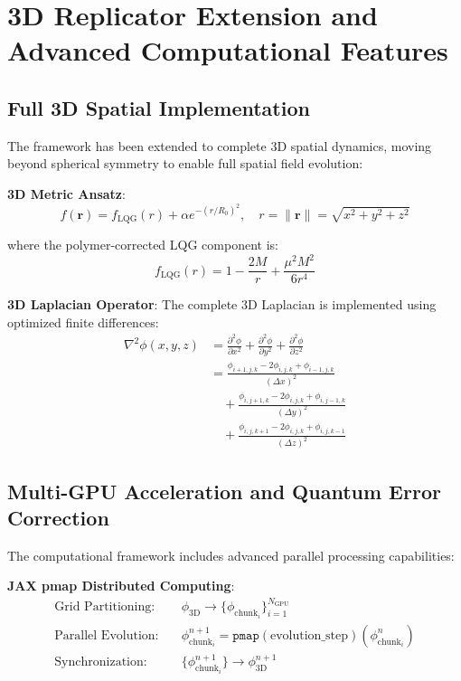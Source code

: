 \documentclass[11pt]{article}
\begin{document}
\section{3D Replicator Extension and Advanced Computational Features}

\subsection{Full 3D Spatial Implementation}

The framework has been extended to complete 3D spatial dynamics, moving beyond spherical symmetry to enable full spatial field evolution:

\textbf{3D Metric Ansatz}:
\begin{equation}
f(\mathbf{r}) = f_{\text{LQG}}(r) + \alpha e^{-(r/R_0)^2}, \quad r = \|\mathbf{r}\| = \sqrt{x^2 + y^2 + z^2}
\end{equation}

where the polymer-corrected LQG component is:
\begin{equation}
f_{\text{LQG}}(r) = 1 - \frac{2M}{r} + \frac{\mu^2 M^2}{6r^4}
\end{equation}

\textbf{3D Laplacian Operator}:
The complete 3D Laplacian is implemented using optimized finite differences:
\begin{align}
\nabla^2\phi(x,y,z) &= \frac{\partial^2\phi}{\partial x^2} + \frac{\partial^2\phi}{\partial y^2} + \frac{\partial^2\phi}{\partial z^2} \\
&= \frac{\phi_{i+1,j,k} - 2\phi_{i,j,k} + \phi_{i-1,j,k}}{(\Delta x)^2} \\
&\quad + \frac{\phi_{i,j+1,k} - 2\phi_{i,j,k} + \phi_{i,j-1,k}}{(\Delta y)^2} \\
&\quad + \frac{\phi_{i,j,k+1} - 2\phi_{i,j,k} + \phi_{i,j,k-1}}{(\Delta z)^2}
\end{align}

\subsection{Multi-GPU Acceleration and Quantum Error Correction}

The computational framework includes advanced parallel processing capabilities:

\textbf{JAX pmap Distributed Computing}:
\begin{align}
\text{Grid Partitioning:} &\quad \phi_{\text{3D}} \to \{\phi_{\text{chunk}_i}\}_{i=1}^{N_{\text{GPU}}} \\
\text{Parallel Evolution:} &\quad \phi_{\text{chunk}_i}^{n+1} = \texttt{pmap}(\text{evolution\_step})(\phi_{\text{chunk}_i}^n) \\
\text{Synchronization:} &\quad \{\phi_{\text{chunk}_i}^{n+1}\} \to \phi_{\text{3D}}^{n+1}
\end{align}
\end{document}
